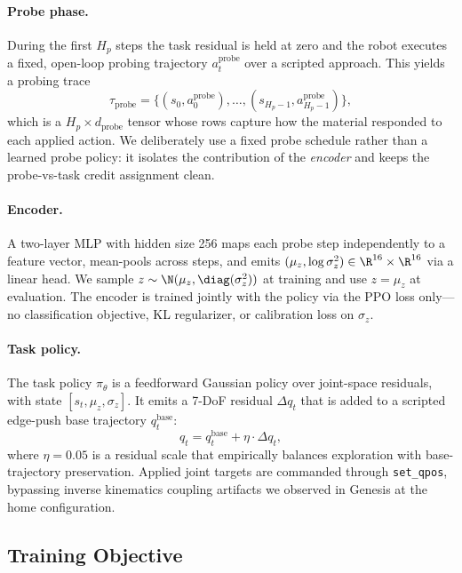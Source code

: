 \paragraph{Probe phase.}
During the first $H_p$ steps the task residual is held at zero and the robot executes a fixed, open-loop probing trajectory $a^{\mathrm{probe}}_t$ over a scripted approach. This yields a probing trace
\begin{equation}
    \tau_{\mathrm{probe}} = \{(s_0, a^{\mathrm{probe}}_0), \dots, (s_{H_p-1}, a^{\mathrm{probe}}_{H_p-1})\},
\end{equation}
which is a $H_p \times d_{\mathrm{probe}}$ tensor whose rows capture how the material responded to each applied action. We deliberately use a fixed probe schedule rather than a learned probe policy: it isolates the contribution of the \emph{encoder} and keeps the probe-vs-task credit assignment clean.

\paragraph{Encoder.}
A two-layer MLP with hidden size 256 maps each probe step independently to a feature vector, mean-pools across steps, and emits $(\mu_z, \log \sigma_z^2) \in \R^{16} \times \R^{16}$ via a linear head. We sample $z \sim \N(\mu_z, \diag(\sigma_z^2))$ at training and use $z = \mu_z$ at evaluation. The encoder is trained jointly with the policy via the PPO loss only---no classification objective, KL regularizer, or calibration loss on $\sigma_z$.

\paragraph{Task policy.}
The task policy $\pi_\theta$ is a feedforward Gaussian policy over joint-space residuals, with state $[s_t, \mu_z, \sigma_z]$. It emits a 7-DoF residual $\Delta q_t$ that is added to a scripted edge-push base trajectory $q^{\mathrm{base}}_t$:
\begin{equation}
    q_t = q^{\mathrm{base}}_t + \eta \cdot \Delta q_t,
\end{equation}
where $\eta = 0.05$ is a residual scale that empirically balances exploration with base-trajectory preservation. Applied joint targets are commanded through \texttt{set\_qpos}, bypassing inverse kinematics coupling artifacts we observed in Genesis at the home configuration.

\subsection{Training Objective}

